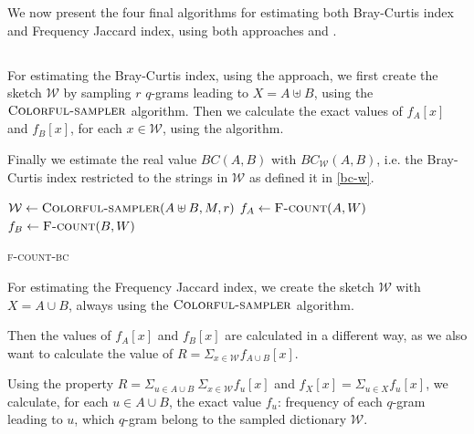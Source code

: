 We now present the four final algorithms for estimating both Bray-Curtis index and Frequency Jaccard index, using both approaches
\fcount and \fsamp.

\subsection*{\fcount}

For estimating the Bray-Curtis index, using the \fcount approach, we first create the sketch $\mathcal{W}$ by sampling $r$ $q$-grams leading to $X = A \uplus B$,
using the $\textsc{Colorful-sampler}$ algorithm. Then we calculate the exact values of $f_{A}[x]$ and $f_{B}[x]$, for each $x \in \mathcal{W}$,
using the \fcount algorithm.

Finally we estimate the real value $BC(A,B)$ with $BC_{ \mathcal{W} }(A,B)$, i.e. the Bray-Curtis index restricted to the strings in $\mathcal{W}$ as defined it in \eqref{bc-w}.

\begin{algorithm}[h]
	\small
	\DontPrintSemicolon
	\BlankLine
	$\mathcal{W} \gets \textsc{Colorful-sampler}(A \uplus B, M, r)$ \;
	$f_{A} \gets \textsc{F-count}(A, W)$ \;
	$f_{B} \gets \textsc{F-count}(B, W)$ \;
	\BlankLine
	\caption{\textsc{f-count-bc}}
	\label{alg:randomsample}
	\label{alg:sample}
\end{algorithm}

For estimating the Frequency Jaccard index, we create the sketch $\mathcal{W}$ with $X = A \cup B$,
always using the $\textsc{Colorful-sampler}$ algorithm. 

Then the values of $f_{A}[x]$ and $f_{B}[x]$ are calculated in a different way, as we also want to calculate the value of $R = \Sigma_{x \in \mathcal{W}} f_{A \cup B}[x]$.

Using the property $R = \Sigma_{u \in A \cup B}\ \Sigma_{x \in \mathcal{W}} f_{u}[x] $ and $f_{X}[x] = \Sigma_{u \in X}{ f_{u}[x] }$, we calculate, for each $u \in A \cup B$,  the exact value $f_{u}$: frequency of each $q$-gram leading to $u$, which $q$-gram belong to the sampled dictionary $\mathcal{W}$.

